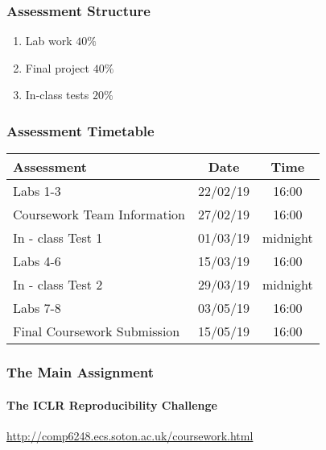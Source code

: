 \documentclass[\beamerclass]{beamer}
\begin{document}

\begin{frame}
	\frametitle{Assessment Structure}
	\begin{enumerate}
		\item Lab work $40\%$
		\item Final project $40\%$ \\  
		\item In-class tests $20\%$ \\	
	\end{enumerate}
\end{frame}

\begin{frame}
	\frametitle{Assessment Timetable}
	
	\begin{center}
	\begin{tabular}{ l c  c}
		 Assessment & Date  & Time\\ \hline
		 Labs 1-3  &  22/02/19 & 16:00 \\ 
		 Coursework Team Information & 27/02/19 & 16:00 \\
		 In - class Test 1 & 01/03/19 & midnight  \\		 
		 Labs 4-6  & 15/03/19 & 16:00 \\  
		 In - class Test 2 & 29/03/19 & midnight  \\		 
		 Labs 7-8 & 03/05/19 & 16:00   \\
		 Final Coursework Submission & 15/05/19 & 16:00 \\
	\end{tabular}
	\end{center}
	
\end{frame}

\begin{frame}
	\frametitle{The Main Assignment}
	\framesubtitle{The ICLR Reproducibility Challenge}
	\url{http://comp6248.ecs.soton.ac.uk/coursework.html}
	
\end{frame}
\end{document}
